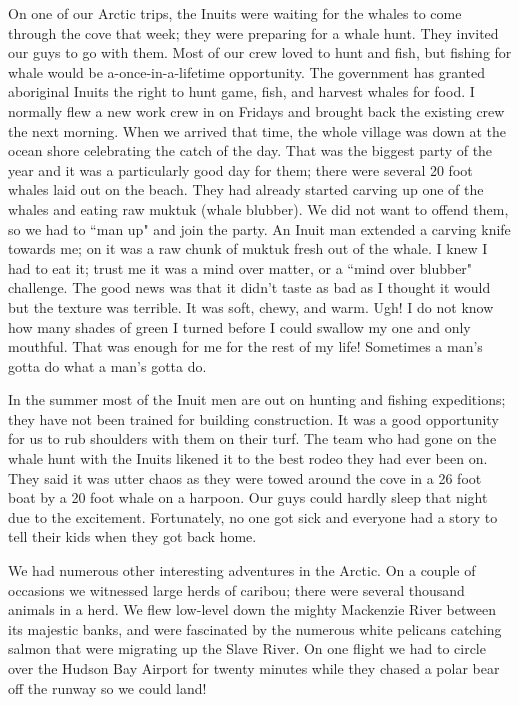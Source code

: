 \documentclass[oneside]{book}
\begin{document}
On one of our Arctic trips, the Inuits were waiting for the whales to come through the cove that week; they were preparing for a whale hunt. They invited our guys to go with them. Most of our crew loved to hunt and fish, but fishing for whale would be a-once-in-a-lifetime opportunity. The government has granted aboriginal Inuits the right to hunt game, fish, and harvest whales for food. I normally flew a new work crew in on Fridays and brought back the existing crew the next morning. When we arrived that time, the whole village was down at the ocean shore celebrating the catch of the day. That was the biggest party of the year and it was a particularly good day for them; there were several 20 foot whales laid out on the beach. They had already started carving up one of the whales and eating raw muktuk (whale blubber). We did not want to offend them, so we had to ``man up" and join the party. An Inuit man extended a carving knife towards me; on it was a raw chunk of muktuk fresh out of the whale. I knew I had to eat it; trust me it was a mind over matter, or a ``mind over blubber" challenge. The good news was that it didn't taste as bad as I thought it would but the texture was terrible. It was soft, chewy, and warm. Ugh! I do not know how many shades of green I turned before I could swallow my one and only mouthful. That was enough for me for the rest of my life! Sometimes a man's gotta do what a man's gotta do. 

In the summer most of the Inuit men are out on hunting and fishing expeditions; they have not been trained for building construction. It was a good opportunity for us to rub shoulders with them on their turf. The team who had gone on the whale hunt with the Inuits likened it to the best rodeo they had ever been on. They said it was utter chaos as they were towed around the cove in a 26 foot boat by a 20 foot whale on a harpoon. Our guys could hardly sleep that night due to the excitement. Fortunately, no one got sick and everyone had a story to tell their kids when they got back home.

We had numerous other interesting adventures in the Arctic. On a couple of occasions we witnessed large herds of caribou; there were several thousand animals in a herd. We flew low-level down the mighty Mackenzie River between its majestic banks, and were fascinated by the numerous white pelicans catching salmon that were migrating up the Slave River. On one flight we had to circle over the Hudson Bay Airport for twenty minutes while they chased a polar bear off the runway so we could land! 
\end{document}
